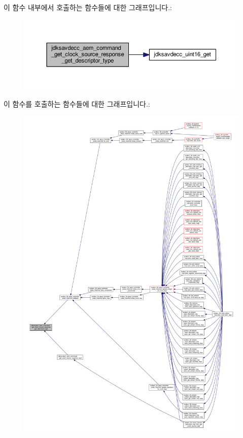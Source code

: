 이 함수 내부에서 호출하는 함수들에 대한 그래프입니다.\+:
\nopagebreak
\begin{figure}[H]
\begin{center}
\leavevmode
\includegraphics[width=350pt]{group__command__get__clock__source__response_ga0e8da8583b547be389a3fd8205f78f26_cgraph}
\end{center}
\end{figure}




이 함수를 호출하는 함수들에 대한 그래프입니다.\+:
\nopagebreak
\begin{figure}[H]
\begin{center}
\leavevmode
\includegraphics[width=350pt]{group__command__get__clock__source__response_ga0e8da8583b547be389a3fd8205f78f26_icgraph}
\end{center}
\end{figure}


